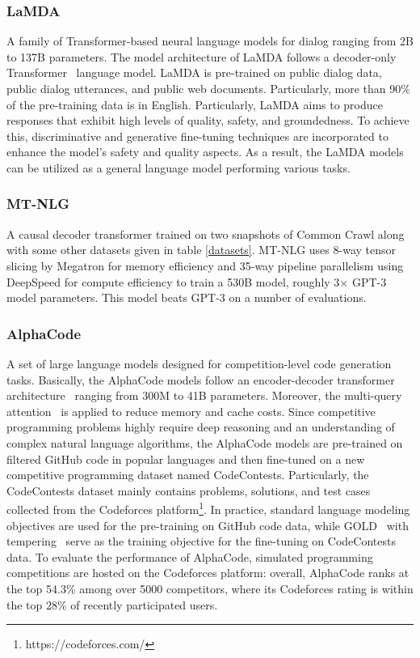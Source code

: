 \subsubsection{LaMDA~\cite{thoppilan2022lamda}}
A family of Transformer-based neural language models for dialog ranging from 2B to 137B parameters. The model architecture of LaMDA follows a decoder-only Transformer~\cite{Transformers} language model. LaMDA is pre-trained on public dialog data, public dialog utterances, and public web documents. Particularly, more than 90\% of the pre-training data is in English. Particularly, LaMDA aims to produce responses that exhibit high levels of quality, safety, and groundedness. To achieve this, discriminative and generative fine-tuning techniques are incorporated to enhance the model's safety and quality aspects. As a result, the LaMDA models can be utilized as a general language model performing various tasks.

\subsubsection{MT-NLG~\cite{mtnlg}}
A causal decoder transformer trained on two snapshots of Common Crawl along with some other datasets given in table \ref{datasets}. MT-NLG uses 8-way tensor slicing by Megatron for memory efficiency and 35-way pipeline parallelism using DeepSpeed for compute efficiency to train a 530B model, roughly 3$\times$ GPT-3 model parameters. This model beats GPT-3 on a number of evaluations.

\subsubsection{AlphaCode~\cite{li2022competition}}
A set of large language models designed for competition-level code generation tasks. Basically, the AlphaCode models follow an encoder-decoder transformer architecture~\cite{Transformers} ranging from 300M to 41B parameters. Moreover, the multi-query attention~\cite{shazeer2019fast} is applied to reduce memory and cache costs. Since competitive programming problems highly require deep reasoning and an understanding of complex natural language algorithms, the AlphaCode models are pre-trained on filtered GitHub code in popular languages and then fine-tuned on a new competitive programming dataset named CodeContests. Particularly, the CodeContests dataset mainly contains problems, solutions, and test cases collected from the Codeforces platform\footnote{https://codeforces.com/}. In practice, standard language modeling objectives are used for the pre-training on GitHub code data, while GOLD~\cite{pang2020text} with tempering~\cite{dabre2020softmax} serve as the training objective for the fine-tuning on CodeContests data. To evaluate the performance of AlphaCode, simulated programming competitions are hosted on the Codeforces platform: overall, AlphaCode ranks at the top 54.3\% among over 5000 competitors, where its Codeforces rating is within the top 28\% of recently participated users.

